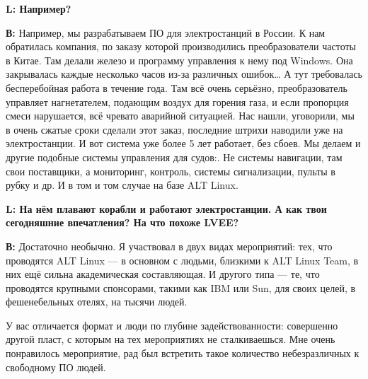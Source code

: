 \documentclass[10pt, a5paper]{article}
\begin{document}
{\noindent \bf L: Например?}

{\noindent \bf В:} Например, мы разрабатываем ПО для электростанций в России. К нам обратилась компания, по заказу которой производились преобразователи частоты в Китае. Там делали железо и программу управления к нему под Windows. Она закрывалась каждые несколько часов из-за различных ошибок… А тут требовалась бесперебойная работа в течение года. Там всё очень серьёзно, преобразователь управляет нагнетателем, подающим воздух для горения газа, и если пропорция смеси нарушается, всё чревато аварийной ситуацией. Нас нашли, уговорили, мы в очень сжатые сроки сделали этот заказ, последние штрихи наводили уже на электростанции. И вот система уже более 5 лет работает, без сбоев. Мы делаем и другие подобные системы управления для судов:. Не системы навигации, там свои поставщики, а мониторинг, контроль, системы сигнализации, пульты в рубку и др. И в том и том случае на базе ALT Linux. 

{\noindent \bf L: На нём плавают корабли и работают электростанции. А как твои сегодняшние впечатления? На что похоже LVEE?}

{\noindent \bf В:} Достаточно необычно. Я участвовал в двух видах мероприятий: тех, что проводятся ALT Linux --- в основном с людьми, близкими к ALT Linux Team, в них ещё сильна академическая составляющая. И другого типа --- те, что проводятся крупными спонсорами, такими как IBM или Sun, для своих целей, в фешенебельных отелях,  на тысячи людей.

У вас отличается формат и люди по глубине задействованности: совершенно другой пласт, с которым на тех мероприятиях не сталкиваешься. Мне очень понравилось мероприятие, рад был встретить такое количество небезразличных к свободному ПО людей.
\end{document}
